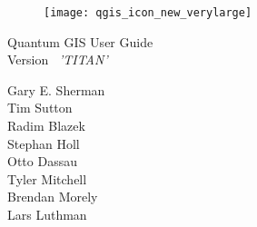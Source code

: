 \begin{titlepage}
\begin{center}

\begin{figure}[H]
\begin{center}
\texttt{[image: qgis\_icon\_new\_verylarge]} 
\end{center}
\end{figure}

\Large{Quantum GIS User Guide\\ Version ~\CURRENT \textsl{'TITAN'}}

\vspace{2cm}

\large{Gary E. Sherman \\ Tim Sutton \\ Radim Blazek \\ Stephan Holl \\ 
Otto Dassau \\ Tyler Mitchell \\ Brendan Morely \\ Lars Luthman  \\ \date{\mydate\today}}

\end{center}
\end{titlepage}
